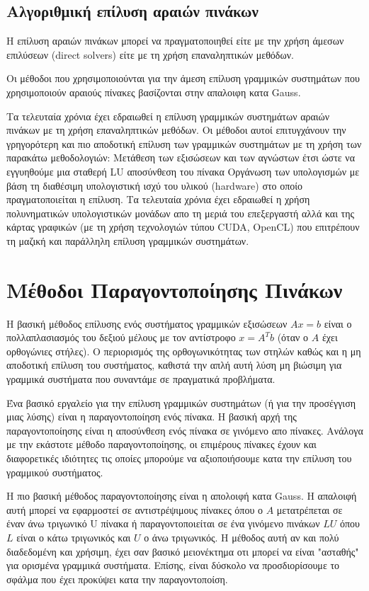 \subsection{Αλγοριθμική επίλυση αραιών πινάκων}
Η επίλυση αραιών πινάκων μπορεί να πραγματοποιηθεί είτε με την χρήση άμεσων επιλύσεων \textlatin{(direct solvers)} είτε με τη χρήση επαναληπτικών μεθόδων.

Οι μέθοδοι που χρησιμοποιούνται για την άμεση επίλυση γραμμικών συστημάτων που χρησιμοποιούν αραιούς πίνακες βασίζονται στην απαλοιφη κατα \textlatin{Gauss}.

Τα τελευταία χρόνια έχει εδραιωθεί η επίλυση γραμμικών συστημάτων αραιών πινάκων με τη χρήση επαναληπτικών μεθόδων. Οι μέθοδοι αυτοί επιτυγχάνουν την γρηγορότερη και πιο αποδοτική επίλυση των γραμμικών συστημάτων με τη χρήση των παρακάτω μεθοδολογιών:
Μετάθεση των εξισώσεων και των αγνώστων έτσι ώστε να εγγυηθούμε μια σταθερή \textlatin{LU} αποσύνθεση του πίνακα
Οργάνωση των υπολογισμών με βάση τη διαθέσιμη υπολογιστική ισχύ του υλικού \textlatin{(hardware)} στο οποίο πραγματοποιείται η επίλυση. Τα τελευταία χρόνια έχει εδραιωθεί η χρήση πολυνηματικών υπολογιστικών μονάδων απο τη μεριά του επεξεργαστή αλλά και της κάρτας γραφικών (με τη χρήση τεχνολογιών τύπου \textlatin{CUDA, OpenCL}) που επιτρέπουν τη μαζική και παράλληλη επίλυση γραμμικών συστημάτων.

\section{Μέθοδοι Παραγοντοποίησης Πινάκων}

Η βασική μέθοδος επίλυσης ενός συστήματος γραμμικών εξισώσεων $Ax = b$ είναι ο πολλαπλασιασμός του δεξιού μέλους με τον αντίστροφο $x = A^Tb$ (όταν ο $A$ έχει ορθογώνιες στήλες). Ο περιορισμός της ορθογωνικότητας των στηλών καθώς και η μη αποδοτική επίλυση του συστήματος, καθιστά την απλή αυτή λύση μη βιώσιμη για γραμμικά συστήματα που συναντάμε σε πραγματικά προβλήματα.

Ένα βασικό εργαλείο για την επίλυση γραμμικών συστημάτων (ή για την προσέγγιση μιας λύσης) είναι η παραγοντοποίηση ενός πίνακα. Η βασική αρχή της παραγοντοποίησης είναι η αποσύνθεση ενός πίνακα σε γινόμενο απο πίνακες. Ανάλογα με την εκάστοτε μέθοδο παραγοντοποίησης, οι επιμέρους πίνακες έχουν και διαφορετικές ιδιότητες τις οποίες μπορούμε να αξιοποιήσουμε κατα την επίλυση του γραμμικού συστήματος.

Η πιο βασική μέθοδος παραγοντοποίησης είναι η απολοιφή κατα \textlatin{Gauss}. Η απαλοιφή αυτή μπορεί να εφαρμοστεί σε αντιστρέψιμους πίνακες όπου ο $A$ μετατρέπεται σε έναν άνω τριγωνικό U πίνακα ή παραγοντοποιείται σε ένα γινόμενο πινάκων $LU$ όπου $L$ είναι ο κάτω τριγωνικός και $U$ ο άνω τριγωνικός. Η μέθοδος αυτή αν και πολύ διαδεδομένη και χρήσιμη, έχει σαν βασικό μειονέκτημα οτι μπορεί να είναι "ασταθής" για ορισμένα γραμμικά συστήματα. Επίσης, είναι δύσκολο να προσδιορίσουμε το σφάλμα που έχει προκύψει κατα την παραγοντοποίση.

